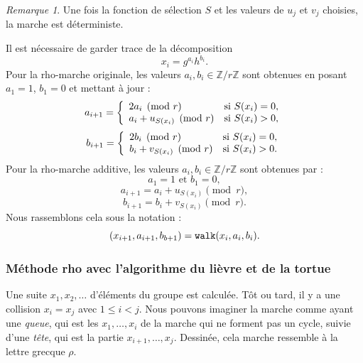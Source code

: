 \documentclass[a4paper, titlepage]{article}
\theoremstyle{definition}
\theoremstyle{remark}
\newtheorem{rema}[theo]{Remarque}
\def\Z{\mathbb Z}
\begin{document}
\begin{rema}
Une fois la fonction de sélection $S$ et les valeurs de $u_j$ et $v_j$ choisies, la marche est déterministe.
\end{rema}

Il est nécessaire de garder trace de la décomposition 
$$x_i = g^{a_i}h^{b_i}.$$ 
Pour la rho-marche originale, les valeurs $a_i, b_i \in \Z/r\Z$ sont obtenues en posant $a_1 = 1$, $b_1 = 0$ et mettant à jour :
$$a_{i+1} = \left\{\begin{array}{l l}
2a_i \pmod{r} & \text{si } S(x_i) = 0, \\
a_i + u_{S(x_i)} \pmod{r} & \text{si } S(x_i) > 0, \\
\end{array}\right.$$
$$b_{i+1} = \left\{\begin{array}{l l}
2b_i \pmod{r} & \text{si } S(x_i) = 0, \\
b_i + v_{S(x_i)} \pmod{r} & \text{si } S(x_i) > 0. \\
\end{array}\right.$$
Pour la rho-marche additive, les valeurs $a_i, b_i \in \Z/r\Z$ sont obtenues par :
$$a_1 = 1\text{ et } b_1 = 0,$$
$$a_{i+1} = a_i + u_{S(x_i)} \pmod{r}, $$
$$b_{i+1} = 
b_i + v_{S(x_i)} \pmod{r}.$$
Nous rassemblons cela sous la notation :
$$(x_{i+1}, a_{i+1}, b_{b+1}) = \verb|walk| (x_i, a_i, b_i).$$

\subsubsection{Méthode rho avec l'algorithme du lièvre et de la tortue}

Une suite $x_1, x_2, \dots$ d'éléments du groupe est calculée. Tôt ou tard, il y a une collision $x_i = x_j$ avec $1 \leqslant i < j$. Nous pouvons imaginer la marche comme ayant une \textit{queue}, qui est les $x_1, \dots, x_i$ de la marche qui ne forment pas un cycle, suivie d'une \textit{tête}, qui est la partie $x_{i+1}, \dots, x_j$. Dessinée, cela marche ressemble à la lettre grecque $\rho$.
\end{document}
